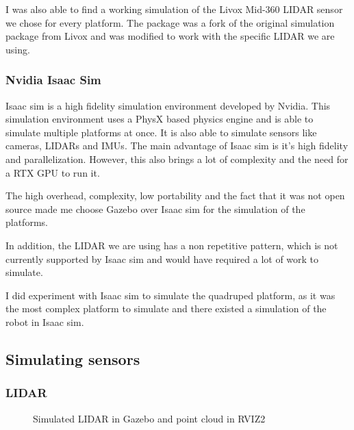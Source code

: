 \documentclass[11pt]{article}
\begin{document}
            I was also able to find a working simulation of the Livox Mid-360 LIDAR sensor we chose for every platform. The package \cite{livox_lidar_simulation_fork} was a fork of the original simulation package from Livox \cite{livox_laser_simulation} and was modified to work with the specific LIDAR we are using. 
        \subsubsection{Nvidia Isaac Sim}

            Isaac sim is a high fidelity simulation environment developed by Nvidia. This simulation environment uses a PhysX based physics engine and is able to simulate multiple platforms at once. It is also able to simulate sensors like cameras, LIDARs and IMUs. The main advantage of Isaac sim is it's high fidelity and parallelization. However, this also brings a lot of complexity and the need for a RTX GPU to run it.

            The high overhead, complexity, low portability and the fact that it was not open source made me choose Gazebo over Isaac sim for the simulation of the platforms.

            In addition, the LIDAR we are using has a non repetitive pattern, which is not currently supported by Isaac sim and would have required a lot of work to simulate.

            I did experiment with Isaac sim to simulate the quadruped platform, as it was the most complex platform to simulate and there existed a simulation of the robot in Isaac sim.
    \subsection{Simulating sensors}
        \subsubsection{LIDAR}

        \begin{figure}[H]
            \centering
            \caption{Simulated LIDAR in Gazebo and point cloud in RVIZ2}
        \end{figure}
\end{document}
